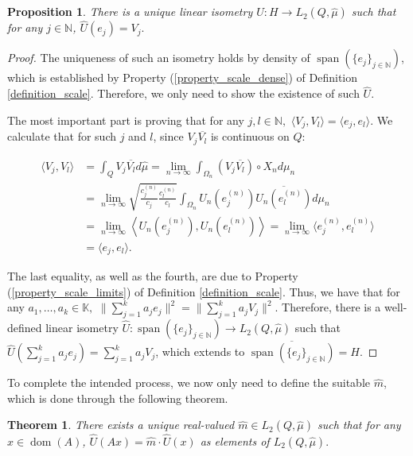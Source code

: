 \documentclass[10pt,a4paper]{amsart}
\newtheorem{theorem}{Theorem}[section]
\newtheorem{prop}[thm]{Proposition}
\def \Span{\operatorname{span}}
\def \Dom{\operatorname{dom}}
\def \HMU{\hat{\mu}}
\def \HU{\hat{U}}
\def \Hm{\hat{m}}
\def \LL{\langle}
\def \RR{\rangle}
\begin{document}
\begin{prop}\label{proposition_unique_isometry}
	There is a unique linear isometry $\HU: H\rightarrow L_2(Q,\HMU)$ such that for any $j\in\mathbb{N}$, $\HU(e_j)=V_j.$
\end{prop}
\begin{proof}
	The uniqueness of such an isometry holds by density of $\Span(\{e_j\}_{j\in\mathbb{N}})$, which is established by Property (\ref{property_scale_dense}) of Definition \ref{definition_scale}. Therefore, we only need to show the existence of such $\HU$.
	
	The most important part is proving that for any $j,l\in\mathbb{N},$ $\LL V_j,V_l\RR=\LL e_j, e_l\RR.$ We calculate that for such $j$ and $l$, since $V_j\overline{V_l}$ is continuous on $Q$:
	
	\begin{align*}
		\LL V_j, V_l\RR&=\int_{Q} V_j\overline{V_l}d\HMU=\lim_{n\rightarrow\infty} \int_{\Omega_n} \left(V_j\overline{V_l}\right)\circ X_n d\mu_n\\
		&=\lim_{n\rightarrow\infty}\sqrt{\frac{c_j^{(n)}}{c_j}\frac{c_l^{(n)} }{c_l}}\int_{\Omega_n}U_n\left(e_j^{(n)}\right)\overline{U_n\left(e_l^{(n)}\right)}d\mu_n\\
		&=\lim_{n\rightarrow\infty}\left\LL U_n\left(e_j^{(n)}\right), U_n\left(e_l^{(n)}\right)\right\RR=\lim_{n\rightarrow\infty}\LL e_j^{(n)}, e_l^{(n)}\RR\\
		&=\LL e_j, e_l\RR.
	\end{align*}
	
	The last equality, as well as the fourth, are due to Property (\ref{property_scale_limits}) of Definition \ref{definition_scale}. Thus, we have that for any $a_1,\dots, a_k \in \mathbb{K},$ $\|\sum_{j=1}^{k}a_j e_j\|^2=\|\sum_{j=1}^{k}a_j V_j\|^2.$ Therefore, there is a well-defined linear	 isometry $\HU:\Span(\{e_j\}_{j\in\mathbb{N}})\rightarrow L_2(Q,\HMU)$ such that $\HU(\sum_{j=1}^{k} a_j e_j)=\sum_{j=1}^{k} a_j V_j$, which extends to $\overline{\Span(\{e_j\}_{j\in\mathbb{N}})}=H$. 
\end{proof}

To complete the intended process, we now only need to define the suitable $\Hm$, which is done through the following theorem.
\begin{theorem}\label{theorem_multiplication_operator}
	There exists a unique real-valued $\Hm \in L_2(Q, \HMU)$ such that for any $x\in\Dom(A)$, $\HU(Ax)=\Hm\cdot \HU(x)$ as elements of $L_2(Q,\HMU).$
\end{theorem}
\end{document}
